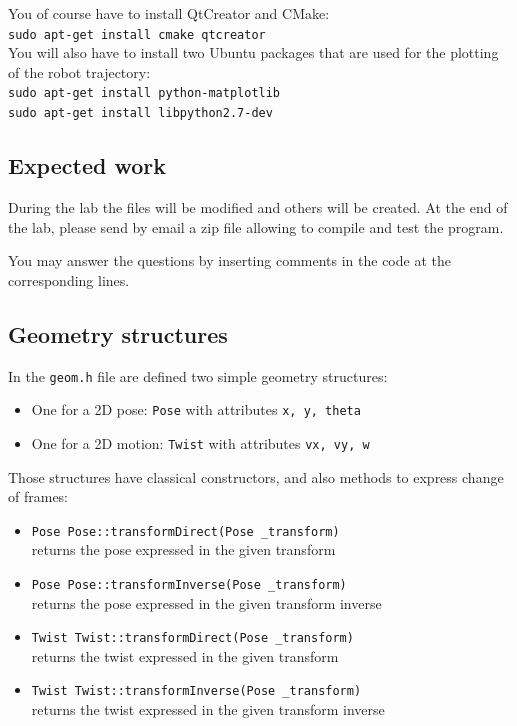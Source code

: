 \documentclass{ecnreport}
\begin{document}
You of course have to install QtCreator and CMake:\\
\texttt{sudo apt-get install cmake qtcreator} \\

You will also have to install two Ubuntu packages that are used for the plotting of the robot trajectory:\\
\texttt{sudo apt-get install python-matplotlib} \\ 
\texttt{sudo apt-get install libpython2.7-dev} 

\subsection{Expected work}

During the lab the files will be modified and others will be created.
At the end of the lab, please send by email a zip file allowing to compile and test the program.

You may answer the questions by inserting comments in the code at the corresponding lines.

\subsection{Geometry structures}

In the \texttt{geom.h} file are defined two simple geometry structures:
\begin{itemize}
 \item One for a 2D pose: \texttt{Pose} with attributes \texttt{x, y, theta}
 \item One for a 2D motion: \texttt{Twist} with attributes \texttt{vx, vy, w} 
\end{itemize}Those structures have classical constructors, and also methods to express change of frames:
\begin{itemize}
 \item \texttt{Pose Pose::transformDirect(Pose \_transform)} \\returns the pose  expressed in the given transform
 \item \texttt{Pose Pose::transformInverse(Pose \_transform)}\\ returns the pose expressed in the given transform inverse
 \item \texttt{Twist Twist::transformDirect(Pose \_transform)} \\returns the twist expressed in the given transform
 \item \texttt{Twist Twist::transformInverse(Pose \_transform)}\\ returns the twist expressed in the given transform inverse
 \end{itemize}
\end{document}
